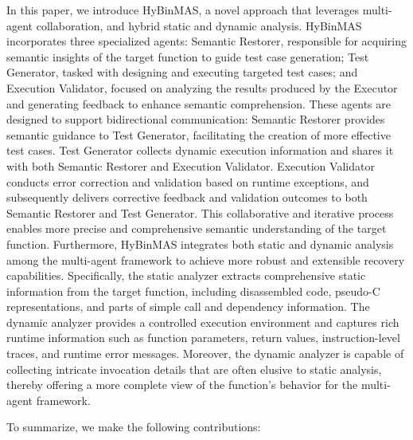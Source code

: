 \documentclass[acmsmall,screen,review,anonymous]{acmart} %
\begin{document}
In this paper, we introduce HyBinMAS, a novel approach that leverages multi-agent collaboration, and hybrid static and dynamic analysis. HyBinMAS incorporates three specialized agents: Semantic Restorer, responsible for acquiring semantic insights of the target function to guide test case generation; Test Generator, tasked with designing and executing targeted test cases; and Execution Validator, focused on analyzing the results produced by the Executor and generating feedback to enhance semantic comprehension. These agents are designed to support bidirectional communication: Semantic Restorer provides semantic guidance to Test Generator, facilitating the creation of more effective test cases. Test Generator collects dynamic execution information and shares it with both Semantic Restorer and Execution Validator. Execution Validator conducts error correction and validation based on runtime exceptions, and subsequently delivers corrective feedback and validation outcomes to both Semantic Restorer and Test Generator. This collaborative and iterative process enables more precise and comprehensive semantic understanding of the target function.
Furthermore, HyBinMAS integrates both static and dynamic analysis among the multi-agent framework to achieve more robust and extensible recovery capabilities. Specifically, the static analyzer extracts comprehensive static information from the target function, including disassembled code, pseudo-C representations, and parts of simple call and dependency information. The dynamic analyzer provides a controlled execution environment and captures rich runtime information such as function parameters, return values, instruction-level traces, and runtime error messages. Moreover, the dynamic analyzer is capable of collecting intricate invocation details that are often elusive to static analysis, thereby offering a more complete view of the function's behavior for the multi-agent framework.

To summarize, we make the following contributions:
\end{document}
